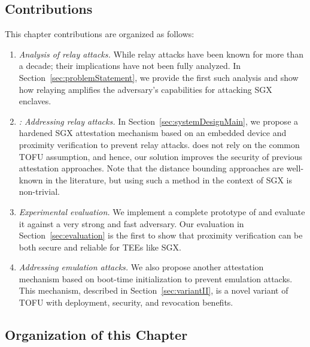 \subsection{Contributions} This chapter contributions are organized as follows:

\begin{enumerate}
    \item \emph{Analysis of relay attacks.} While relay attacks have been known for more than a decade; their implications have not been fully analyzed. In Section~\ref{sec:problemStatement}, we provide the first such analysis and show how relaying amplifies the adversary's capabilities for attacking SGX enclaves.   

    \item \emph{\name: Addressing relay attacks.} In Section~\ref{sec:systemDesignMain}, we propose a hardened SGX attestation mechanism based on an embedded device and proximity verification to prevent relay attacks. \name does not rely on the common TOFU assumption, and hence, our solution improves the security of previous attestation approaches. Note that the distance bounding approaches are well-known in the literature, but using such a method in the context of SGX is non-trivial.
    
    \item \emph{Experimental evaluation.} We implement a complete prototype of \name and evaluate it against a very strong and fast adversary. Our evaluation in Section~\ref{sec:evaluation} is the first to show that proximity verification can be both secure and reliable for TEEs like SGX.
    
    \item \emph{Addressing emulation attacks.} We also propose another attestation mechanism based on boot-time initialization to prevent emulation attacks. This mechanism, described in Section~\ref{sec:variantII}, is a novel variant of TOFU with deployment, security, and revocation benefits.
\end{enumerate}

\subsection{Organization of this Chapter}

